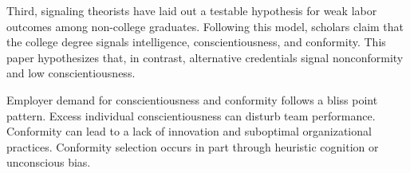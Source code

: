 \documentclass[review]{elsarticle}
\begin{document}
Third, signaling theorists have laid out a testable hypothesis for weak labor outcomes among non-college graduates.
Following this model, scholars claim that the college degree signals intelligence, conscientiousness, and conformity\cite{caplan2018case}.
This paper hypothesizes that, in contrast, alternative credentials signal nonconformity and low conscientiousness.




Employer demand for conscientiousness and conformity follows a bliss point pattern.
Excess individual conscientiousness can disturb team performance\cite{curcseu2019personality}.
Conformity can lead to a lack of innovation and suboptimal organizational practices\cite{symon2006neglected}.
Conformity selection occurs in part through heuristic cognition or unconscious bias.

\end{document}
